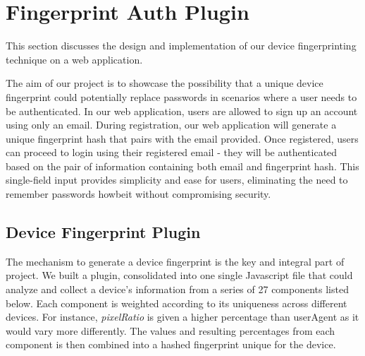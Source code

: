 \documentclass{acm_proc_article-sp}
\begin{document}
\section{Fingerprint Auth Plugin}
This section discusses the design and implementation of our device fingerprinting technique on a web application.
 
The aim of our project is to showcase the possibility that a unique device fingerprint could potentially replace passwords in scenarios where a user needs to be authenticated. In our web application, users are allowed to sign up an account using only an email. During registration, our web application will generate a unique fingerprint hash that pairs with the email provided. Once registered, users can proceed to login using their registered email - they will be authenticated based on the pair of information containing both email and fingerprint hash. This single-field input provides simplicity and ease for users, eliminating the need to remember passwords howbeit without compromising security. 

\subsection{Device Fingerprint Plugin}
The mechanism to generate a device fingerprint is the key and integral part of project. We built a plugin, consolidated into one single Javascript file that could analyze and collect a device’s information from a series of 27 components listed below. Each component is weighted according to its uniqueness across different devices. For instance, \textit{pixelRatio} is given a higher percentage than userAgent as it would vary more differently. The values and resulting percentages from each component is then combined into a hashed fingerprint unique for the device.
\end{document}
